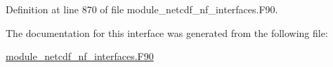 Definition at line 870 of file module\+\_\+netcdf\+\_\+nf\+\_\+interfaces.\+F90.



The documentation for this interface was generated from the following file\+:\begin{DoxyCompactItemize}
\item 
\hyperlink{module__netcdf__nf__interfaces_8F90}{module\+\_\+netcdf\+\_\+nf\+\_\+interfaces.\+F90}\end{DoxyCompactItemize}
